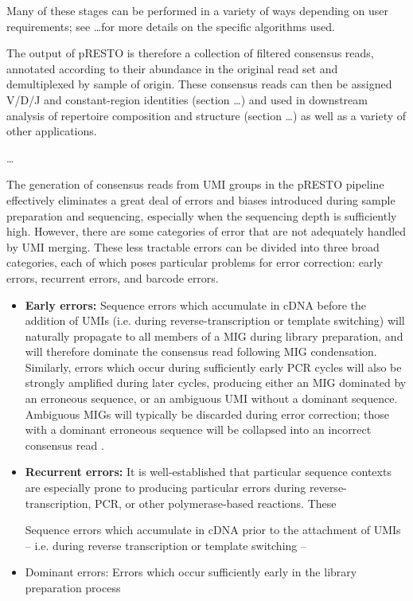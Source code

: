 
Many of these stages can be performed in a variety of ways depending on user requirements; see \dots for more details on the specific algorithms used.

The output of pRESTO is therefore a collection of filtered consensus reads, annotated according to their abundance in the original read set and demultiplexed by sample of origin. These consensus reads can then be assigned V/D/J and constant-region identities (section \dots) and used in downstream analysis of repertoire composition and structure (section \dots) as well as a variety of other applications.

\dots

The generation of consensus reads from UMI groups in the pRESTO pipeline effectively eliminates a great deal of errors and biases introduced during sample preparation and sequencing, especially when the sequencing depth is sufficiently high. However,  there are some categories of error that are not adequately handled by UMI merging. These less tractable errors can be divided into three broad categories, each of which poses particular problems for error correction: early errors, recurrent errors, and barcode errors.
\begin{itemize}
\item \textbf{Early errors:} Sequence errors which accumulate in cDNA before the addition of UMIs (i.e. during reverse-transcription or template switching) will naturally propagate to all members of a MIG during library preparation, and will therefore dominate the consensus read following MIG condensation. Similarly, errors which occur during sufficiently early PCR cycles will also be strongly amplified during later cycles, producing either an MIG dominated by an erroneous sequence, or an ambiguous UMI without a dominant sequence. Ambiguous MIGs will typically be discarded during error correction; those with a dominant erroneous sequence will be collapsed into an incorrect consensus read \citep{shugay2014migec}.
\item \textbf{Recurrent errors:} It is well-established %
that particular sequence contexts are especially prone to producing particular errors during reverse-transcription, PCR, or other polymerase-based reactions. These 

Sequence errors which accumulate in cDNA prior to the attachment of UMIs -- i.e. during reverse transcription or template switching -- 
\item Dominant errors: Errors which occur sufficiently early in the library preparation process
\end{itemize}
